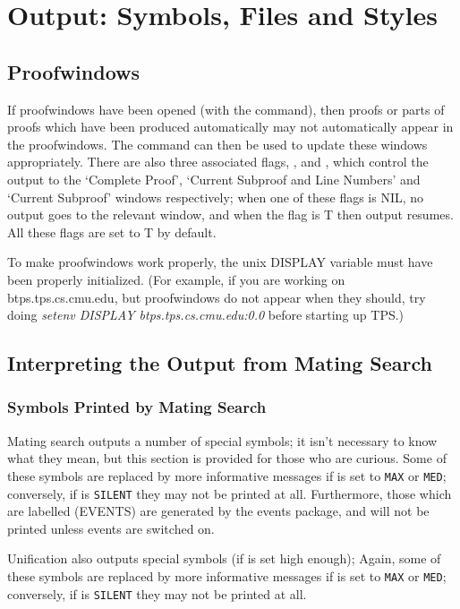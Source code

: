 \chapter{Output: Symbols, Files and Styles}
\label{output}

\section{Proofwindows}

If proofwindows have been opened (with the 
command), then proofs or parts of proofs which have been produced
automatically may not automatically appear in the proofwindows.
The command  can then be
used to update these windows appropriately.  There are also three
associated flags, ,  and
, which control the output to the `Complete
Proof', `Current Subproof and Line Numbers'
and `Current Subproof' windows respectively; when one of these
flags is NIL, no output goes to the relevant window, and when the flag
is T then output resumes. All these flags are set to T by default.

To make proofwindows work properly, the unix DISPLAY variable must have
been properly initialized. (For example, if you are working on
btps.tps.cs.cmu.edu, but proofwindows do not appear when they should,
try doing {\it setenv DISPLAY btps.tps.cs.cmu.edu:0.0} before starting up TPS.)


\section{Interpreting the Output from Mating Search}

\subsection{Symbols Printed by Mating Search}
Mating search outputs a number of special symbols; it isn't necessary to know what they mean,
but this section is provided for those who are curious.
Some of these symbols are replaced by more informative messages if 
is set to {\tt MAX} or {\tt MED}; conversely, if  is {\tt SILENT} they
may not be printed at all. Furthermore, those which are labelled (EVENTS) are generated by the events package,
and will not be printed unless events are switched on.

Unification also outputs special symbols (if  is set high enough);
Again, some of these symbols are replaced by more informative messages if 
is set to {\tt MAX} or {\tt MED}; conversely, if  is {\tt SILENT} they
may not be printed at all.

